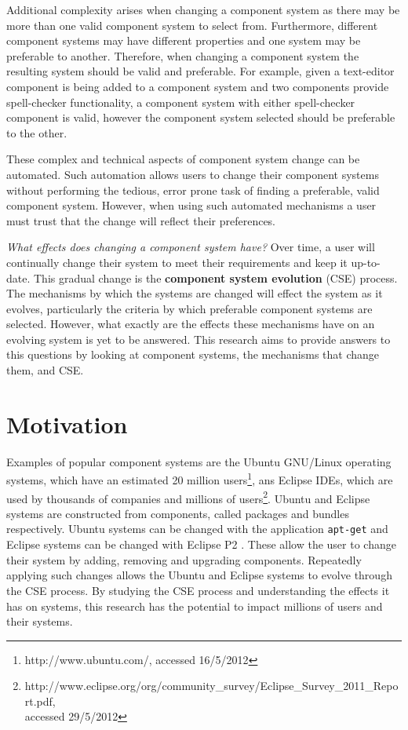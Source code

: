 Additional complexity arises when changing a component system as there may be more than one valid component system to select from.
Furthermore, different component systems may have different properties and one system may be preferable to another.
Therefore, when changing a component system the resulting system should be valid and preferable.  
For example, given a text-editor component is being added to a component system and two components provide spell-checker functionality, 
a component system with either spell-checker component is valid, however the component system selected should be preferable to the other.

These complex and technical aspects of component system change can be automated. 
Such automation allows users to change their component systems without performing the tedious, error prone task of finding a preferable, valid component system.
However, when using such automated mechanisms a user must trust that the change will reflect their preferences.


\textit{What effects does changing a component system have?}
Over time, a user will continually change their system to meet their requirements and keep it up-to-date.
This gradual change is the \textbf{component system evolution} (CSE) process.
The mechanisms by which the systems are changed will effect the system as it evolves,
particularly the criteria by which preferable component systems are selected.
However, what exactly are the effects these mechanisms have on an evolving system is yet to be answered. 
This research aims to provide answers to this questions by looking at component systems, the mechanisms that change them, and CSE.

\section{Motivation}
Examples of popular component systems are the Ubuntu GNU/Linux operating systems, which have an estimated 20 million users\footnote{http://www.ubuntu.com/, accessed 16/5/2012},
ans Eclipse IDEs, which are used by thousands of companies and millions of users\footnote{http://www.eclipse.org/org/community\_survey/Eclipse\_Survey\_2011\_Report.pdf, \\accessed 29/5/2012}.
Ubuntu and Eclipse systems are constructed from components, called packages and bundles respectively. 
Ubuntu systems can be changed with the application \texttt{apt-get} \citep{Barth2005} and Eclipse systems can be changed with Eclipse P2 \citep{leBerre2010}.
These allow the user to change their system by adding, removing and upgrading components.
Repeatedly applying such changes allows the Ubuntu and Eclipse systems to evolve through the CSE process.
By studying the CSE process and understanding the effects it has on systems, this research has the potential to impact millions of users and their systems.


